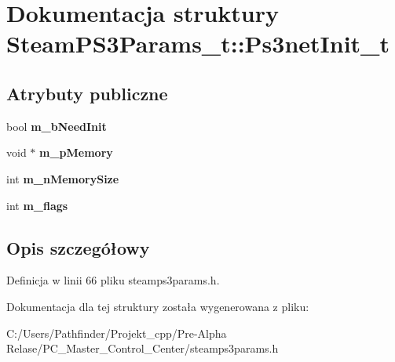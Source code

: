 \hypertarget{struct_steam_p_s3_params__t_1_1_ps3net_init__t}{}\section{Dokumentacja struktury Steam\+P\+S3\+Params\+\_\+t\+:\+:Ps3net\+Init\+\_\+t}
\label{struct_steam_p_s3_params__t_1_1_ps3net_init__t}
\subsection*{Atrybuty publiczne}
\begin{DoxyCompactItemize}
\item 
\mbox{\label{struct_steam_p_s3_params__t_1_1_ps3net_init__t_a620ae03b019a05073df77a31b6880f99}} 
bool {\bfseries m\+\_\+b\+Need\+Init}
\item 
\mbox{\label{struct_steam_p_s3_params__t_1_1_ps3net_init__t_a4ecb9469fe35145bbf15cb1564fa6c39}} 
void $\ast$ {\bfseries m\+\_\+p\+Memory}
\item 
\mbox{\label{struct_steam_p_s3_params__t_1_1_ps3net_init__t_abaa42b3ce7c5ea3721945f422d3bf1a0}} 
int {\bfseries m\+\_\+n\+Memory\+Size}
\item 
\mbox{\label{struct_steam_p_s3_params__t_1_1_ps3net_init__t_a2376476353ebf7169807cf104a4fa01a}} 
int {\bfseries m\+\_\+flags}
\end{DoxyCompactItemize}


\subsection{Opis szczegółowy}


Definicja w linii 66 pliku steamps3params.\+h.



Dokumentacja dla tej struktury została wygenerowana z pliku\+:\begin{DoxyCompactItemize}
\item 
C\+:/\+Users/\+Pathfinder/\+Projekt\+\_\+cpp/\+Pre-\/\+Alpha Relase/\+P\+C\+\_\+\+Master\+\_\+\+Control\+\_\+\+Center/steamps3params.\+h\end{DoxyCompactItemize}
